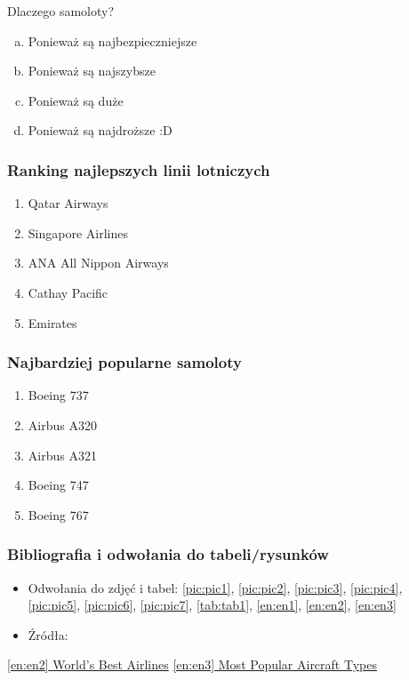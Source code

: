 \documentclass{beamer}
\begin{document}
\begin{frame}{Dlaczego samoloty?}
\begin{enumerate}[a)]
\item Ponieważ są najbezpieczniejsze
\pause
\item Ponieważ są najszybsze
\pause
\item Ponieważ są duże
\pause
\item Ponieważ są najdroższe :D
\end{enumerate}
  \label{en:en1}
\end{frame}


\begin{frame}
\frametitle{Ranking najlepszych linii lotniczych}
\begin{enumerate}[1)]
\item Qatar Airways
\pause
\item Singapore Airlines
\pause
\item ANA All Nippon Airways
\pause
\item Cathay Pacific
\pause
\item Emirates
\end{enumerate}
  \label{en:en2}
\end{frame}


\begin{frame}
\frametitle{Najbardziej popularne samoloty}
\begin{enumerate}[1)]
\item Boeing 737
\pause
\item Airbus A320
\pause
\item Airbus A321
\pause
\item Boeing 747
\pause
\item Boeing 767
\end{enumerate}
  \label{en:en3}
\end{frame}

\begin{frame}
\frametitle{Bibliografia i odwołania do tabeli/rysunków}
\begin{itemize}
\item Odwołania do zdjęć i tabel: \ref{pic:pic1}, \ref{pic:pic2}, \ref{pic:pic3}, \ref{pic:pic4}, \ref{pic:pic5}, \ref{pic:pic6}, \ref{pic:pic7}, \ref{tab:tab1}, \ref{en:en1}, \ref{en:en2}, \ref{en:en3}
\end{itemize}
\begin{itemize}
\item Źródła:
\end{itemize}
\href{https://www.worldairlineawards.com/award/worlds-best-airline/}{\ref{en:en2} World's Best Airlines}
\href{https://www.aircraftcompare.com/news/the-most-popular-aircraft-types-in-the-world/}{\ref{en:en3} Most Popular Aircraft Types}
\end{frame}
\end{document}
